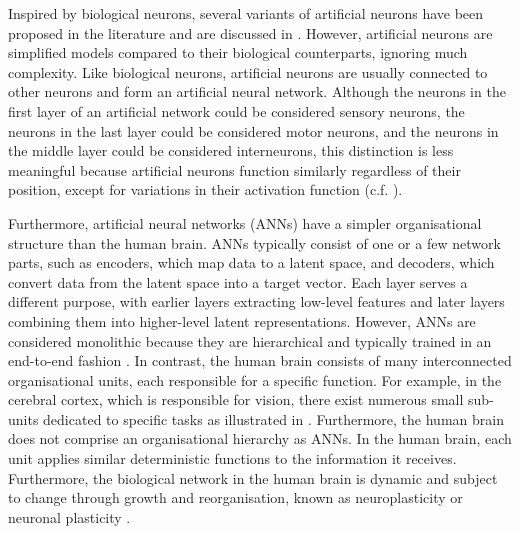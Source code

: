 Inspired by biological neurons, several variants of artificial neurons have been proposed in the literature and are discussed in .
However, artificial neurons are simplified models compared to their biological counterparts, ignoring much complexity. Like biological neurons, artificial neurons are usually connected to other neurons and form an artificial neural network. Although the neurons in the first layer of an artificial network could be considered sensory neurons, the neurons in the last layer could be considered motor neurons, and the neurons in the middle layer could be considered interneurons, this distinction is less meaningful because artificial neurons function similarly regardless of their position, except for variations in their activation function (c.f. ).

Furthermore, artificial neural networks (ANNs) have a simpler organisational structure than the human brain. ANNs typically consist of one or a few network parts, such as encoders, which map data to a latent space, and decoders, which convert data from the latent space into a target vector. Each layer serves a different purpose, with earlier layers extracting low-level features and later layers combining them into higher-level latent representations. However, ANNs are considered monolithic because they are hierarchical and typically trained in an end-to-end fashion . In contrast, the human brain consists of many interconnected organisational units, each responsible for a specific function. For example, in the cerebral cortex, which is responsible for vision, there exist numerous small sub-units dedicated to specific tasks as illustrated in . Furthermore, the human brain does not comprise an organisational hierarchy as ANNs. In the human brain, each unit applies similar deterministic functions to the information it receives. Furthermore, the biological network in the human brain is dynamic and subject to change through growth and reorganisation, known as neuroplasticity or neuronal plasticity .

